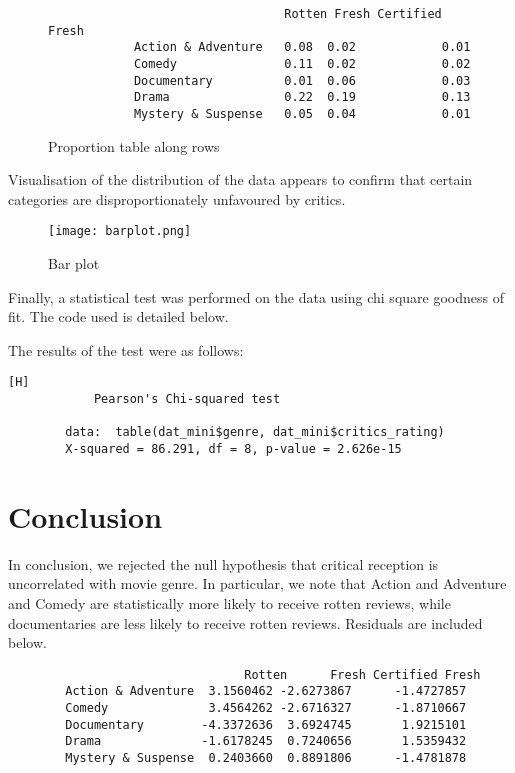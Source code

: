 \documentclass[12pt,a4paper]{article}
\begin{document}
	\begin{figure}[h!]
		\begin{verbatim}
			                     Rotten Fresh Certified Fresh
			Action & Adventure   0.08  0.02            0.01
			Comedy               0.11  0.02            0.02
			Documentary          0.01  0.06            0.03
			Drama                0.22  0.19            0.13
			Mystery & Suspense   0.05  0.04            0.01
		\end{verbatim}
		\caption{\footnotesize Proportion table along rows}
	\end{figure}
	
	Visualisation of the distribution of the data appears to confirm that certain categories are disproportionately unfavoured by critics.
	
	\begin{figure}[h!]\centering
		\caption{\footnotesize Bar plot}
		\texttt{[image: barplot.png]}
	\end{figure} 
	
	Finally, a statistical test was performed on the data using chi square goodness of fit. The code used is detailed below.
	
	
	
	The results of the test were as follows:
	
	\begin{verbatim}[H]
			Pearson's Chi-squared test
		
		data:  table(dat_mini$genre, dat_mini$critics_rating)
		X-squared = 86.291, df = 8, p-value = 2.626e-15
	\end{verbatim}

	\section*{Conclusion}

	In conclusion, we rejected the null hypothesis that critical reception is uncorrelated with movie genre. In particular, we note that Action and Adventure and Comedy are statistically more likely to receive rotten reviews, while documentaries are less likely to receive rotten reviews. Residuals are included below.

	\begin{verbatim}
		                         Rotten      Fresh Certified Fresh
		Action & Adventure  3.1560462 -2.6273867      -1.4727857
		Comedy              3.4564262 -2.6716327      -1.8710667
		Documentary        -4.3372636  3.6924745       1.9215101
		Drama              -1.6178245  0.7240656       1.5359432
		Mystery & Suspense  0.2403660  0.8891806      -1.4781878
	\end{verbatim}
\end{document}
